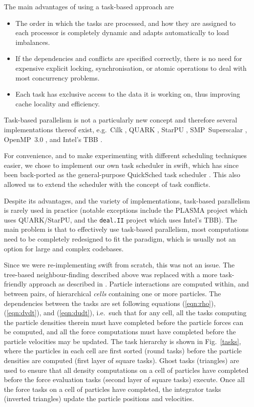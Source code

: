 \documentclass{sig-alternate-05-2015}
\newcommand{\eqn}[1] {(\ref{eqn:#1})}
\newcommand{\swift}{{\sc swift}\xspace}
\newcommand{\qs}{{\sc QuickSched}\xspace}
\begin{document}
The main advantages of using a task-based approach are
%
\begin{itemize}
    \item The order in which the tasks are processed, and how they
        are assigned to each processor is completely
        dynamic and adapts automatically to load imbalances.
    \item If the dependencies and conflicts are specified correctly,
        there is no need for expensive explicit locking, synchronisation,
        or atomic operations to deal with most concurrency problems.
    \item Each task has exclusive access to the data it is working on,
        thus improving cache locality and efficiency.
\end{itemize}
%
Task-based parallelism is not a particularly new concept and therefore
several implementations thereof exist, e.g.~Cilk \cite{ref:Blumofe1995},
QUARK \cite{ref:QUARK}, StarPU \cite{ref:Augonnet2011},
SMP~Superscalar \cite{ref:SMPSuperscalar}, OpenMP~3.0 \cite{ref:Duran2009},
and Intel's TBB \cite{ref:Reinders2007}.

For convenience, and to make experimenting with different scheduling
techniques easier, we chose to implement our own task scheduler
in \swift, which has since been back-ported as the general-purpose
\qs task scheduler \cite{gonnet2013quicksched}.
This also allowed us to extend the scheduler with the concept of
task conflicts.

Despite its advantages, and the variety of implementations,
task-based parallelism is rarely used in
practice (notable exceptions include the PLASMA project
\cite{ref:Agullo2009} which uses QUARK/StarPU, and the {\tt deal.II} project
\cite{ref:Bangerth2007} which uses Intel's TBB).
The main problem is that to effectively use task-based parallelism,
most computations need to be completely redesigned to fit the paradigm,
which is usually not an option for large and complex codebases.

Since we were re-implementing \swift from scratch, this was not an issue.
The tree-based neighbour-finding described above was replaced with a more
task-friendly approach as described in \cite{gonnet2015efficient}.
Particle interactions are computed within, and between pairs, of
hierarchical {\em cells} containing one or more particles.
The dependencies between the tasks are set following
equations \eqn{rho}, \eqn{dvdt}, and \eqn{dudt}, i.e.~such that for any cell,
all the tasks computing the particle densities therein must have
completed before the particle forces can be computed, and all the
force computations must have completed before the particle velocities
may be updated.
The task hierarchy is shown in Fig.~\ref{tasks}, where the particles in each
cell are first sorted (round tasks) before the particle densities
are computed (first layer of square tasks).
Ghost tasks (triangles) are used to ensure that all density computations
on a cell of particles have completed before the force evaluation tasks
(second layer of square tasks) execute.
Once all the force tasks on a cell of particles have completed,
the integrator tasks (inverted triangles) update the particle positions 
and velocities.
\end{document}
